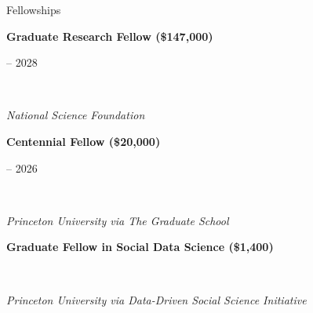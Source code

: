 \documentclass{cv} %
\begin{document}

\begin{cvSection}{Fellowships}

\begin{minipage}[t]{0.50\linewidth}
    \raggedright \textbf{Graduate Research Fellow (\$147,000)}%
\end{minipage}
\hfill
\begin{minipage}[t]{0.45\linewidth}
     -- 2028%
\end{minipage}
\\
\begin{minipage}[t]{0.70\linewidth}
    \raggedright \textit{National Science Foundation}%
\end{minipage}
\hfill
\begin{minipage}[t]{0.25\linewidth}
\end{minipage}

\begin{minipage}[t]{0.70\linewidth}
    \raggedright \textbf{Centennial Fellow (\$20,000)}%
\end{minipage}
\hfill
\begin{minipage}[t]{0.25\linewidth}
     -- 2026%
\end{minipage}
\\
\begin{minipage}[t]{0.70\linewidth}
    \raggedright \textit{Princeton University via The Graduate School}%
\end{minipage}
\hfill
\begin{minipage}[t]{0.25\linewidth}
\end{minipage}

\begin{minipage}[t]{0.70\linewidth}
    \raggedright \textbf{Graduate Fellow in Social Data Science (\$1,400)}%
\end{minipage}
\hfill
\begin{minipage}[t]{0.25\linewidth}
\end{minipage}
\\
\begin{minipage}[t]{0.70\linewidth}
    \raggedright \textit{Princeton University via Data-Driven Social Science Initiative}%
\end{minipage}
\hfill
\begin{minipage}[t]{0.25\linewidth}
\end{minipage}

\end{cvSection}
\end{document}
